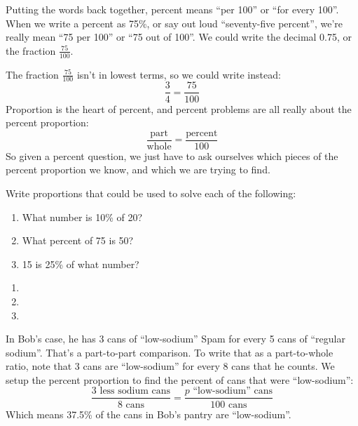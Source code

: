 Putting the words back together, percent means ``per 100'' or ``for every 100''. When we write a percent as 75\%, or say out loud ``seventy-five percent'', we're really mean ``75 per 100'' or ``75 out of 100''. We could write the decimal 0.75, or the fraction $\frac{75}{100}$.

The fraction $\frac{75}{100}$ isn't in lowest terms, so we could write instead: \[\frac{3}{4} = \frac{75}{100}\]
Proportion is the heart of percent, and percent problems are all really about the percent proportion: \[\frac{\text{part}}{\text{whole}} = \frac{\text{percent}}{100}\]
So given a percent question, we just have to ask ourselves which pieces of the percent proportion we know, and which we are trying to find.

\begin{boxedex}
Write proportions that could be used to solve each of the following:
\begin{enumerate}
	\item What number is 10\% of 20?
	\item What percent of 75 is 50?
	\item 15 is 25\% of what number?
\end{enumerate}

\expsoln
\begin{enumerate}
	\item {}

	\item {}

	\item {}
\end{enumerate}
\end{boxedex}

In Bob's case, he has 3 cans of ``low-sodium'' Spam for every 5 cans of ``regular sodium''. That's a part-to-part comparison. To write that as a part-to-whole ratio, note that 3 cans are ``low-sodium'' for every 8 cans that he counts. We setup the percent proportion to find the percent of cans that were ``low-sodium'':
\[\frac{3\text{ less sodium cans}}{8 \text{ cans}} = \frac{p \text{ ``low-sodium'' cans}}{100 \text{ cans}}\]
Which means 37.5\% of the cans in Bob's pantry are ``low-sodium''.

